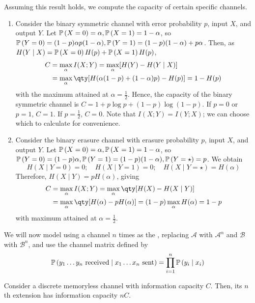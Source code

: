 \begin{example}
    Assuming this result holds, we compute the capacity of certain specific channels.
    \begin{enumerate}
        \item Consider the binary symmetric channel with error probability $p$, input $X$, and output $Y$.
        Let $\mathbb{P}\left({X = 0}\right) = \alpha, \mathbb{P}\left({X = 1}\right) = 1 - \alpha$, so $\mathbb{P}\left({Y = 0}\right) = (1-p)\alpha p(1-\alpha), \mathbb{P}\left({Y = 1}\right) = (1-p)(1-\alpha) + p\alpha$.
        Then, as $H(Y \mid X) = \mathbb{P}\left({X=0}\right) H(p) + \mathbb{P}\left({X = 1}\right) H(p)$,
        \begin{align*}
            C &= \max_\alpha I(X;Y) = \max_\alpha [H(Y) - H(Y\mid X)] \\
            &= \max_\alpha \qty[H(\alpha(1-p) + (1-\alpha)p) - H(p)] = 1 - H(p)
        \end{align*}
        with the maximum attained at $\alpha = \frac{1}{2}$.
        Hence, the capacity of the binary symmetric channel is $C = 1 + p \log p + (1-p) \log (1-p)$.
        If $p = 0$ or $p = 1$, $C = 1$.
        If $p = \frac{1}{2}$, $C = 0$.
        Note that $I(X;Y) = I(Y;X)$; we can choose which to calculate for convenience.
        \item Consider the binary erasure channel with erasure probability $p$, input $X$, and output $Y$.
        Let $\mathbb{P}\left({X = 0}\right) = \alpha, \mathbb{P}\left({X = 1}\right) = 1 - \alpha$, so $\mathbb{P}\left({Y = 0}\right) = (1-p)\alpha, \mathbb{P}\left({Y = 1}\right) = (1-p)(1-\alpha), \mathbb{P}\left({Y = \star}\right) = p$.
        We obtain
        \[ H(X \mid Y = 0) = 0;\quad H(X \mid Y = 1) = 0;\quad H(X \mid Y = \star) = H(\alpha) \]
        Therefore, $H(X \mid Y) = pH(\alpha)$, giving
        \begin{align*}
            C &= \max_\alpha I(X;Y) = \max_\alpha \qty[H(X) - H(X \mid Y)] \\
            &= \max_\alpha \qty[H(\alpha) - pH(\alpha)] = (1-p) \max_\alpha H(\alpha) = 1-p
        \end{align*}
        with maximum attained at $\alpha = \frac{1}{2}$.
    \end{enumerate}
\end{example}
We will now model using a channel $n$ times as the , replacing $\mathcal A$ with $\mathcal A^n$ and $\mathcal B$ with $\mathcal B^n$, and use the channel matrix defined by
\[ \mathbb{P}\left({y_1 \dots y_n \text{ received} \mid x_1 \dots x_n \text{ sent}}\right) = \prod_{i=1}^n \mathbb{P}\left({y_i \mid x_i}\right) \]
\begin{lemma}
    Consider a discrete memoryless channel with information capacity $C$.
    Then, its $n$th extension has information capacity $nC$.
\end{lemma}
